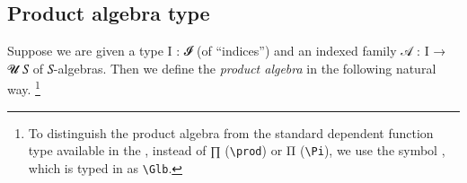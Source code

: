 \documentclass[a4paper,UKenglish,cleveref,autoref,thm-restate]{lipics-v2021}
\begin{document}
\subsection{Product algebra type}\label{ssec:product-algebra-type}
Suppose we are given a type \ab I \as : \ab 𝓘 (of ``indices'') and an indexed family \ab 𝒜 \as : \ab I \as →  \ab 𝓤 \ab 𝑆 of \ab 𝑆-algebras. Then we define the \emph{product algebra}
 
in the following natural way.%
%
\footnote{To distinguish the product algebra from the standard dependent function type available in the \agdastdlib, instead of \af ∏ (\texttt{\textbackslash prod}) or \af Π (\texttt{\textbackslash Pi}), we use the symbol , which is typed in \agdamode as \texttt{\textbackslash Glb}.}%
%
\ccpad
\end{document}
